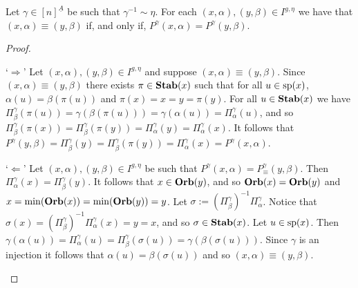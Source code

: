 \documentclass[../main/thesis.tex]{subfiles}
\begin{document}
\begin{lem}
  Let $\gamma \in [n]^{\underline{A}}$ be such that $\gamma^{-1} \sim \eta$. For
  each $(x, \alpha), (y, \beta) \in I^{g, \eta}$ we have that $(x, \alpha)
  \equiv (y, \beta)$ if, and only if, $P^{\gamma}(x, \alpha) = P^{\gamma}(y,
  \beta)$.
	\label{lem:quot-well-defined}
\end{lem}
\begin{proof}
  \begin{myenum}
  \item[`$\Rightarrow$'] Let $(x, \alpha), (y, \beta) \in I^{g, \eta}$ and
    suppose $(x, \alpha) \equiv (y, \beta)$. Since $(x, \alpha) \equiv (y,
    \beta)$ there exists $\pi \in \text{\textbf{Stab}}(x)$ such that for all $u \in \text{sp}(x)$,
    $\alpha (u) = \beta (\pi (u))$ and $\pi (x) = x = y = \pi (y)$. For all $u
    \in \text{\textbf{Stab}}(x)$ we have $\Pi^{\gamma}_{\beta} (\pi (u)) = \gamma (\beta (\pi
    (u))) = \gamma (\alpha (u)) = \Pi^{\gamma}_{\alpha}(u)$, and so
    $\Pi^{\gamma}_{\beta}(\pi (x)) = \Pi^{\gamma}_{\beta}(\pi (y)) =
    \Pi^{\gamma}_{\alpha}(y) = \Pi^{\gamma}_{\alpha}(x)$. It follows that
    $P^{\gamma}(y, \beta) = \Pi^{\gamma}_{\beta} (y) = \Pi^{\gamma}_{\beta} (\pi
    (y)) = \Pi^{\gamma}_{\alpha}(x) = P^{\gamma}(x, \alpha)$.
  \item [`$\Leftarrow$'] Let $(x, \alpha), (y, \beta) \in I^{g, \eta}$ be such
    that $P^{\gamma} (x, \alpha) = P^{\gamma}_{\equiv} (y, \beta)$. Then
    $\Pi^{\gamma}_{\alpha}(x) = \Pi^{\gamma}_\beta(y)$. It follows that $x \in
    \text{\textbf{Orb}}(y)$, and so $\text{\textbf{Orb}} (x) = \text{\textbf{Orb}} (y)$ and $x = \min(\text{\textbf{Orb}}(x)) =
    \min(\text{\textbf{Orb}}(y)) = y$. Let $\sigma :=(\Pi^{\gamma}_\beta)^{-1}
    \Pi^{\gamma}_\alpha$. Notice that $\sigma (x) = (\Pi^{\gamma}_\beta)^{-1}
    \Pi^{\gamma}_\alpha (x) = y = x$, and so $\sigma \in \text{\textbf{Stab}}(x)$. Let $u \in
    \text{sp}(x)$. Then $\gamma (\alpha (u)) = \Pi^\gamma_{\alpha}(u) =
    \Pi^{\gamma}_{\beta}(\sigma (u)) = \gamma (\beta (\sigma (u)))$. Since
    $\gamma$ is an injection it follows that $\alpha (u) = \beta (\sigma (u))$
    and so $(x, \alpha) \equiv (y, \beta)$.
  \end{myenum}
\end{proof}
\end{document}
